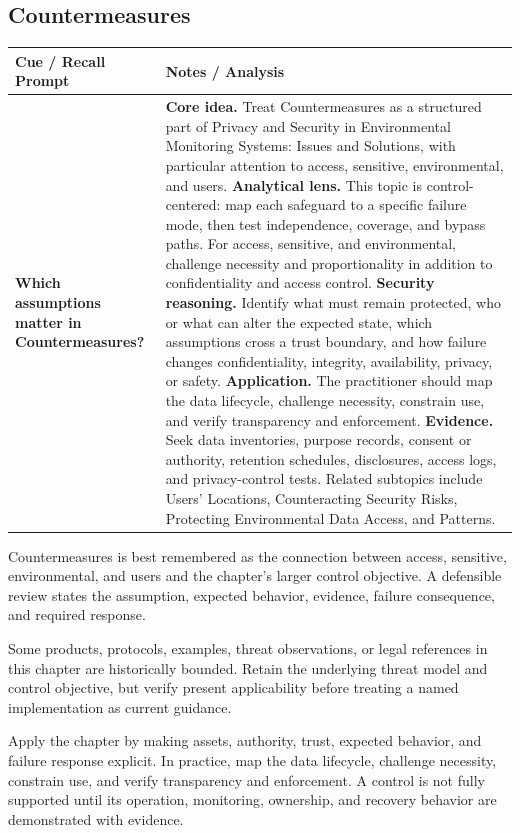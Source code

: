 \documentclass[11pt]{article}
\newcommand{\CornellHeader}{%
\rowcolor{Navy}\color{white}\bfseries Cue / Recall Prompt & \color{white}\bfseries Notes / Analysis\\\hline}
\newcommand{\CornellRow}[2]{%
\cellcolor{CueGray}\RaggedRight\textbf{#1} & \RaggedRight #2\\\hline}
\begin{document}
\subsection*{Countermeasures}
\begin{longtable}{>{\RaggedRight\arraybackslash}p{}|>{\RaggedRight\arraybackslash}p{}}
\CornellHeader
\CornellRow{Which assumptions matter in Countermeasures?}{\textbf{Core idea.} Treat Countermeasures as a structured part of Privacy and Security in Environmental Monitoring Systems: Issues and Solutions, with particular attention to access, sensitive, environmental, and users. \textbf{Analytical lens.} This topic is control-centered: map each safeguard to a specific failure mode, then test independence, coverage, and bypass paths. For access, sensitive, and environmental, challenge necessity and proportionality in addition to confidentiality and access control. \textbf{Security reasoning.} Identify what must remain protected, who or what can alter the expected state, which assumptions cross a trust boundary, and how failure changes confidentiality, integrity, availability, privacy, or safety. \textbf{Application.} The practitioner should map the data lifecycle, challenge necessity, constrain use, and verify transparency and enforcement. \textbf{Evidence.} Seek data inventories, purpose records, consent or authority, retention schedules, disclosures, access logs, and privacy-control tests. Related subtopics include Users' Locations, Counteracting Security Risks, Protecting Environmental Data Access, and Patterns.}
\end{longtable}
\begin{topicsummary}
Countermeasures is best remembered as the connection between access, sensitive, environmental, and users and the chapter's larger control objective. A defensible review states the assumption, expected behavior, evidence, failure consequence, and required response.
\end{topicsummary}
\begin{historybox}
Some products, protocols, examples, threat observations, or legal references in this chapter are historically bounded. Retain the underlying threat model and control objective, but verify present applicability before treating a named implementation as current guidance.
\end{historybox}
\begin{defensebox}
Apply the chapter by making assets, authority, trust, expected behavior, and failure response explicit. In practice, map the data lifecycle, challenge necessity, constrain use, and verify transparency and enforcement. A control is not fully supported until its operation, monitoring, ownership, and recovery behavior are demonstrated with evidence.
\end{defensebox}
\end{document}
